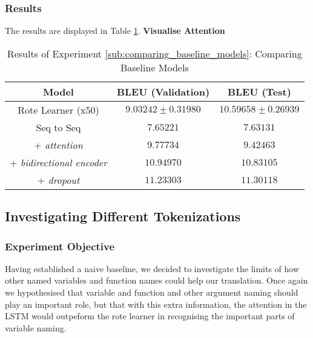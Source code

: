 \subsubsection{Results} %

The results are displayed in Table \ref{table:name_baseline}.
\textbf{Visualise Attention}

\begin{table}[h!]
\begin{center}
\begin{tabular}{ c | c | c }
    Model                            & BLEU (Validation)  & BLEU (Test)    \\
    \hline
    Rote Learner (x50)                & $ 9.03242 \pm  0.31980 $ & $ 10.59658 \pm 0.26939 $   \\
    \hline
    Seq to Seq                        & $ 7.65221 $  & $ 7.63131  $ \\
    + \textit{attention}              & $ 9.77734 $  & $ 9.42463  $ \\
    + \textit{bidirectional encoder}  & $ 10.94970 $ & $ 10.83105 $ \\
    + \textit{dropout}                & $ 11.23303 $ & $ 11.30118 $ \\
    \hline
\end{tabular}
\caption {Results of Experiment \ref{sub:comparing_baseline_models}: Comparing Baseline Models }
\label{table:name_baseline}
\end{center}
\end{table}



\subsection{Investigating Different Tokenizations} %
\label{sub:investigating_different_tokenizations}

\subsubsection{Experiment Objective} %

Having established a naive baseline, we decided to investigate the limits of how other named variables and function names could help our translation.
Once again we hypothesised that variable and function and other argument naming should play an important role, but that with this extra information, the attention in the LSTM would outpeform the rote learner in recognising the important parts of variable naming.

